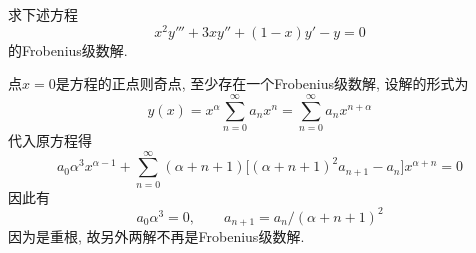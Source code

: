\begin{problem}[习题4.3]
求下述方程
\[
x^2y'''+3xy''+(1-x)y'-y=0
\]
的Frobenius级数解.
\end{problem}

\begin{solution}
点$x=0$是方程的正点则奇点, 至少存在一个Frobenius级数解, 设解的形式为
\[
y(x)=x^{\alpha}\sum_{n=0}^{\infty}a_{n}x^{n}=\sum_{n=0}^{\infty}a_{n}x^{n+\alpha}
\]
代入原方程得
\[
a_{0}\alpha^{3}x^{\alpha-1}+\sum_{n=0}^{\infty}(\alpha+n+1)\Big[(\alpha+n+1)^{2}a_{n+1}-a_{n}\Big]x^{\alpha+n}=0
\]
因此有
\[
a_{0}\alpha^{3}=0,\qquad a_{n+1}=a_{n}/(\alpha+n+1)^{2}
\]
因为是重根, 故另外两解不再是Frobenius级数解.
\end{solution}
